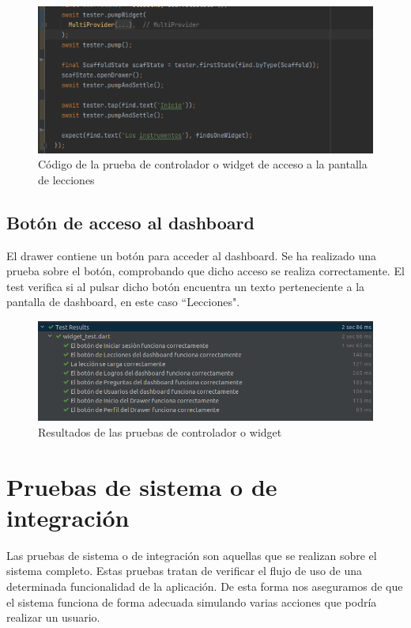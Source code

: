 \begin{figure}[H]
    \centering
    \includegraphics[width=\textwidth]{imagenes/c8/pruebawidget2.png}
    \caption{Código de la prueba de controlador o widget de acceso a la pantalla de lecciones}
    \label{fig:prueba_lecciones}
\end{figure}

\subsection{Botón de acceso al dashboard}
\label{subsec:pruebas-controlador-boton-leccion}
El drawer contiene un botón para acceder al dashboard. Se ha realizado una prueba sobre el botón, comprobando que dicho acceso se realiza correctamente.
El test verifica si al pulsar dicho botón encuentra un texto perteneciente a la pantalla de dashboard, en este caso ``Lecciones". 


\begin{figure}[H]
    \centering
    \includegraphics[width=\textwidth]{imagenes/c8/pruebawidgets.png}
    \caption{Resultados de las pruebas de controlador o widget}
    \label{fig:prueba_widgets}
\end{figure}


\section{Pruebas de sistema o de integración}
\label{sec:pruebas-sistema}
Las pruebas de sistema o de integración son aquellas que se realizan sobre el sistema completo. Estas pruebas tratan de verificar el flujo de uso de una determinada funcionalidad de la aplicación.
De esta forma nos aseguramos de que el sistema funciona de forma adecuada simulando varias acciones que podría realizar un usuario.

